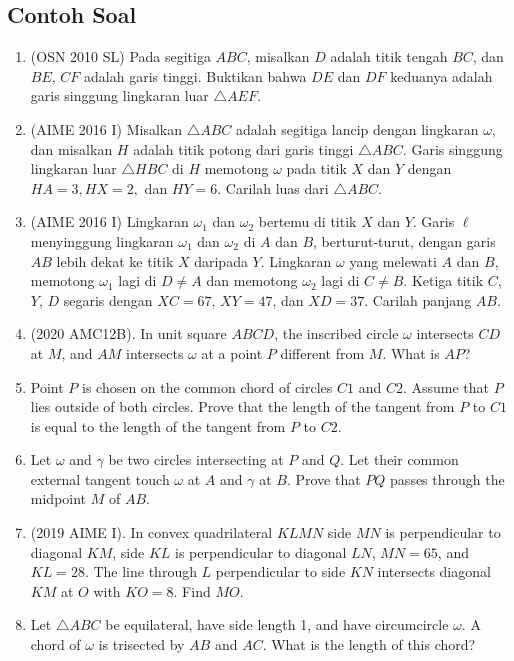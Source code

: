 \documentclass[12pt]{scrartcl}
\begin{document}
\subsection{Contoh Soal}
\begin{enumerate}
    \item (OSN 2010 SL) Pada segitiga $ABC$, misalkan $D$ adalah titik tengah $BC$, dan $BE$, $CF$ adalah garis tinggi. Buktikan bahwa $DE$ dan $DF$ keduanya adalah garis singgung lingkaran luar $\triangle AEF$. %

    \item (AIME 2016 I) Misalkan $\triangle ABC$ adalah segitiga lancip dengan lingkaran $\omega,$ dan misalkan $H$ adalah titik potong dari garis tinggi $\triangle ABC.$ Garis singgung lingkaran luar $\triangle HBC$ di $H$ memotong $\omega$ pada titik $X$ dan $Y$ dengan $HA=3,HX=2,$ dan $HY=6.$ Carilah luas dari $\triangle ABC$.

    \item (AIME 2016 I) Lingkaran $\omega_1$ dan $\omega_2$ bertemu di titik $X$ dan $Y$. Garis $\ell$ menyinggung lingkaran $\omega_1$ dan $\omega_2$ di $A$ dan $B$, berturut-turut, dengan garis $AB$ lebih dekat ke titik $X$ daripada $Y$. Lingkaran $\omega$ yang melewati $A$ dan $B$, memotong $\omega_1$ lagi di $D \neq A$ dan memotong $\omega_2$ lagi di $C \neq B$. Ketiga titik $C$, $Y$, $D$ segaris dengan $XC = 67$, $XY = 47$, dan $XD = 37$. Carilah panjang $AB$.
    
    \item (2020 AMC12B). In unit square $ABCD$, the inscribed circle $\omega$ intersects $CD$ at $M$, and $AM$ intersects $\omega$ at a point $P$ different from $M$. What is $AP$?
\item Point $P$ is chosen on the common chord of circles $C1$ and $C2$. Assume that $P$ lies outside of both circles. Prove that the length of the tangent from $P$ to $C1$ is equal to the length of the tangent from $P$ to $C2$.
\item Let $\omega$ and $\gamma$ be two circles intersecting at $P$ and $Q$. Let their common external tangent touch $\omega$ at $A$ and $\gamma$ at $B$. Prove that $PQ$ passes through the midpoint $M$ of $AB$.
\item (2019 AIME I). In convex quadrilateral $KLMN$ side $MN$ is perpendicular to diagonal $KM$, side $KL$ is perpendicular to diagonal $LN$, $MN = 65$, and $KL = 28$. The line through $L$ perpendicular to side $KN$ intersects diagonal $KM$ at $O$ with $KO = 8$. Find $MO$.
\item Let $\triangle ABC$ be equilateral, have side length 1, and have circumcircle $\omega$. A chord of $\omega$ is trisected by $AB$ and $AC$. What is the length of this chord?
 \end{enumerate}
\end{document}
